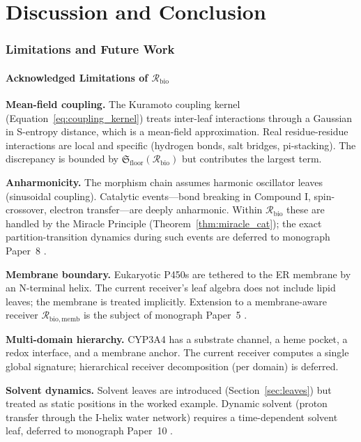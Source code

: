 \documentclass[11pt,twocolumn,a4paper]{article}
\theoremstyle{definition}
\theoremstyle{remark}
\newcommand{\Recv}{\mathcal{R}}
\newcommand{\Floor}{{\mathfrak{S}_{\mathrm{floor}}}}
\begin{document}
\part{Discussion and Conclusion}

\section{Limitations and Future Work}
\label{sec:limits}

\subsection{Acknowledged Limitations of $\Recv_{\mathrm{bio}}$}

\textbf{Mean-field coupling.} The Kuramoto coupling kernel (Equation~\eqref{eq:coupling_kernel}) treats inter-leaf interactions through a Gaussian in S-entropy distance, which is a mean-field approximation. Real residue-residue interactions are local and specific (hydrogen bonds, salt bridges, pi-stacking). The discrepancy is bounded by $\Floor(\Recv_{\mathrm{bio}})$ but contributes the largest term.

\textbf{Anharmonicity.} The morphism chain assumes harmonic oscillator leaves (sinusoidal coupling). Catalytic events---bond breaking in Compound I, spin-crossover, electron transfer---are deeply anharmonic. Within $\Recv_{\mathrm{bio}}$ these are handled by the Miracle Principle (Theorem~\ref{thm:miracle_cat}); the exact partition-transition dynamics during such events are deferred to monograph Paper~8 \citep{sachikonye2025_compoundI}.

\textbf{Membrane boundary.} Eukaryotic P450s are tethered to the ER membrane by an N-terminal helix. The current receiver's leaf algebra does not include lipid leaves; the membrane is treated implicitly. Extension to a membrane-aware receiver $\Recv_{\mathrm{bio,memb}}$ is the subject of monograph Paper~5 \citep{sachikonye2025_membrane}.

\textbf{Multi-domain hierarchy.} CYP3A4 has a substrate channel, a heme pocket, a redox interface, and a membrane anchor. The current receiver computes a single global signature; hierarchical receiver decomposition (per domain) is deferred.

\textbf{Solvent dynamics.} Solvent leaves are introduced (Section~\ref{sec:leaves}) but treated as static positions in the worked example. Dynamic solvent (proton transfer through the I-helix water network) requires a time-dependent solvent leaf, deferred to monograph Paper~10 \citep{sachikonye2025_pcet}.
\end{document}
